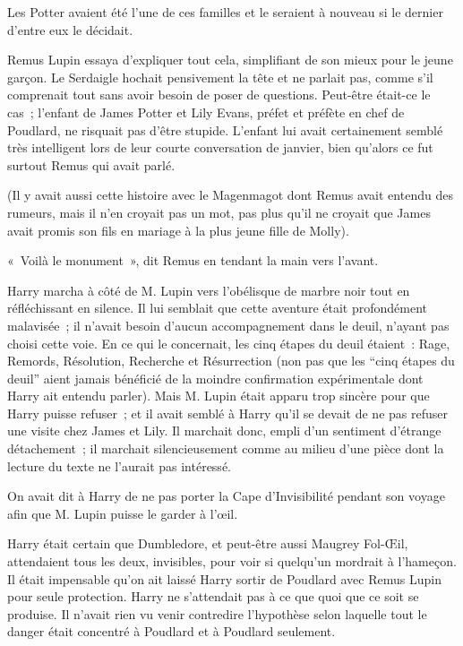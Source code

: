 Les Potter avaient été l'une de ces familles et le seraient à nouveau si le dernier d'entre eux le décidait.

Remus Lupin essaya d'expliquer tout cela, simplifiant de son mieux pour le jeune garçon.
Le Serdaigle hochait pensivement la tête et ne parlait pas, comme s'il comprenait tout sans avoir besoin de poser de questions.
Peut-être était-ce le cas~; l'enfant de James Potter et Lily Evans, préfet et préfète en chef de Poudlard, ne risquait pas d'être stupide.
L'enfant lui avait certainement semblé très intelligent lors de leur courte conversation de janvier, bien qu'alors ce fut surtout Remus qui avait parlé.

(Il y avait aussi cette histoire avec le Magenmagot dont Remus avait entendu des rumeurs, mais il n'en croyait pas un mot, pas plus qu'il ne croyait que James avait promis son fils en mariage à la plus jeune fille de Molly).

«~Voilà le monument~», dit Remus en tendant la main vers l'avant.

\later

Harry marcha à côté de M. Lupin vers l'obélisque de marbre noir tout en réfléchissant en silence.
Il lui semblait que cette aventure était profondément malavisée~; il n'avait besoin d'aucun accompagnement dans le deuil, n'ayant pas choisi cette voie.
En ce qui le concernait, les cinq étapes du deuil étaient~: Rage, Remords, Résolution, Recherche et Résurrection (non pas que les “cinq étapes du deuil” aient jamais bénéficié de la moindre confirmation expérimentale dont Harry ait entendu parler).
Mais M. Lupin était apparu trop sincère pour que Harry puisse refuser~; et il avait semblé à Harry qu'il se devait de ne pas refuser une visite chez James et Lily.
Il marchait donc, empli d'un sentiment d'étrange détachement~; il marchait silencieusement comme au milieu d'une pièce dont la lecture du texte ne l'aurait pas intéressé.

On avait dit à Harry de ne pas porter la Cape d'Invisibilité pendant son voyage afin que M. Lupin puisse le garder à l'œil.

Harry était certain que Dumbledore, et peut-être aussi Maugrey Fol-Œil, attendaient tous les deux, invisibles, pour voir si quelqu'un mordrait à l'hameçon.
Il était impensable qu'on ait laissé Harry sortir de Poudlard avec Remus Lupin pour seule protection.
Harry ne s'attendait pas à ce que quoi que ce soit se produise.
Il n'avait rien vu venir contredire l'hypothèse selon laquelle tout le danger était concentré à Poudlard et à Poudlard seulement.

